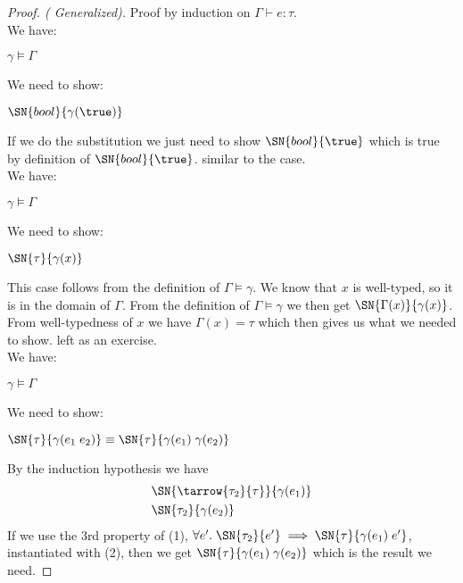 \begin{proof}[Proof. ( Generalized)] Proof by induction on $\Gamma \vdash e : \tau$.
 \\
We have:
\begin{description}
  \item $\gamma \models \Gamma$
\end{description}
We need to show:
\begin{description}
  \item $\SN{bool}{\gamma(\true)}$
\end{description}
If we do the substitution we just need to show $\SN{bool}{\true}$ which is true by definition of $\SN{bool}{\true}$.
 similar to the \true{} case.
\case{\TVar}\\
We have:
\begin{description}
  \item $\gamma \models \Gamma$
\end{description}
We need to show:
\begin{description}
  \item $\SN{\tau}{\gamma(x)}$
\end{description}
This case follows from the definition of $\Gamma \models \gamma$. We know that $x$ is well-typed, so it is in the domain of $\Gamma$. From the definition of $\Gamma \models \gamma$ we then get $\SN{\Gamma(x)}{\gamma(x)}$. From well-typedness of $x$ we have $\Gamma(x) = \tau$ which then gives us what we needed to show.
 left as an exercise.
\case{\TApp}\\
We have:
\begin{description}
  \item $\gamma \models \Gamma$
\end{description}
We need to show:
\begin{description}
  \item $\SN{\tau}{\gamma(e_1 \; e_2)} \equiv \SN{\tau}{\gamma(e_1) \; \gamma(e_2)}$
\end{description}
By the induction hypothesis we have
\begin{align}
  &\SN{\tarrow{\tau_2}{\tau}}{\gamma(e_1)} \\
  &\SN{\tau_2}{\gamma(e_2)}
\end{align}
If we use the 3rd property of (1), $\forall e'. \; \SN{\tau_2}{e'} \implies \SN{\tau}{\gamma(e_1) \; e'}$, instantiated with (2), then we get $\SN{\tau}{\gamma(e_1) \; \gamma(e_2)}$ which is the result we need.

\end{proof}
